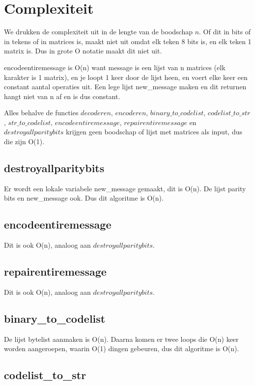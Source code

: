 \documentclass[a4paper]{article}
\begin{document}
\section{Complexiteit}
We drukken de complexiteit uit in de lengte van de boodschap \(n\). Of dit in bits of in tekens of in matrices is, maakt niet uit omdat elk teken 8 bits is, en elk teken 1 matrix is. Dus in grote O notatie maakt dit niet uit.

encodeentiremessage is O(n) want message is een lijst van n matrices (elk karakter is 1 matrix), en je loopt 1 keer door de lijst heen, en voert elke keer een constant aantal operaties uit. Een lege lijst new\_message maken en dit returnen hangt niet van n af en is dus constant.

Alles behalve de functies $decoderen$, $encoderen$, $binary\_to\_codelist$, $codelist\_to\_str$, $str\_to\_codelist$, $encodeentiremessage$, $repairentiremessage$ en $destroyallparitybits$ krijgen geen boodschap of lijst met matrices als input, dus die zijn O(1). 

\subsection{destroyallparitybits}

Er wordt een lokale variabele new\_message gemaakt, dit is O(n). De lijst parity bits en new\_message ook. Dus dit algoritme is O(n).

\subsection{encodeentiremessage}

Dit is ook O(n), analoog aan $destroyallparitybits$.

\subsection{repairentiremessage}

Dit is ook O(n), analoog aan $destroyallparitybits$.

\subsection{binary\_to\_codelist}

De lijst bytelist aanmaken is O(n). Daarna komen er twee loops die O(n) keer worden aangeroepen, waarin O(1) dingen gebeuren, dus dit algoritme is O(n).

\subsection{codelist\_to\_str}
\end{document}
